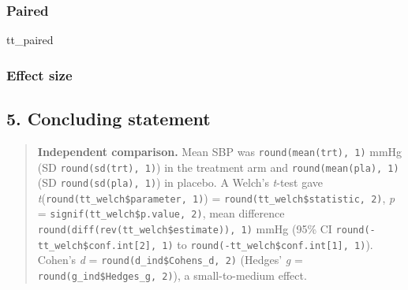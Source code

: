 \documentclass[
]{article}
\newenvironment{Shaded}{\begin{snugshade}}{\end{snugshade}}
\newcommand{\AttributeTok}[1]{\textcolor[rgb]{0.13,0.29,0.53}{#1}}
\newcommand{\ConstantTok}[1]{\textcolor[rgb]{0.56,0.35,0.01}{#1}}
\newcommand{\FunctionTok}[1]{\textcolor[rgb]{0.13,0.29,0.53}{\textbf{#1}}}
\newcommand{\NormalTok}[1]{#1}
\newcommand{\OtherTok}[1]{\textcolor[rgb]{0.56,0.35,0.01}{#1}}
\newcommand{\SpecialCharTok}[1]{\textcolor[rgb]{0.81,0.36,0.00}{\textbf{#1}}}
\begin{document}
\subsubsection{Paired}\label{paired}

\begin{Shaded}
\begin{Highlighting}[]
\NormalTok{tt\_paired}
\end{Highlighting}
\end{Shaded}

\subsubsection{Effect size}\label{effect-size}

\begin{Shaded}
\end{Shaded}

\subsection{5. Concluding statement}\label{concluding-statement}

\begin{quote}
\textbf{Independent comparison.} Mean SBP was
\texttt{round(mean(trt),\ 1)} mmHg (SD \texttt{round(sd(trt),\ 1)}) in
the treatment arm and \texttt{round(mean(pla),\ 1)} (SD
\texttt{round(sd(pla),\ 1)}) in placebo. A Welch's \emph{t}-test gave
\emph{t}(\texttt{round(tt\_welch\$parameter,\ 1)}) =
\texttt{round(tt\_welch\$statistic,\ 2)}, \emph{p} =
\texttt{signif(tt\_welch\$p.value,\ 2)}, mean difference
\texttt{round(diff(rev(tt\_welch\$estimate)),\ 1)} mmHg (95\% CI
\texttt{round(-tt\_welch\$conf.int{[}2{]},\ 1)} to
\texttt{round(-tt\_welch\$conf.int{[}1{]},\ 1)}). Cohen's \emph{d} =
\texttt{round(d\_ind\$Cohens\_d,\ 2)} (Hedges' \emph{g} =
\texttt{round(g\_ind\$Hedges\_g,\ 2)}), a small-to-medium effect.
\end{quote}
\end{document}
